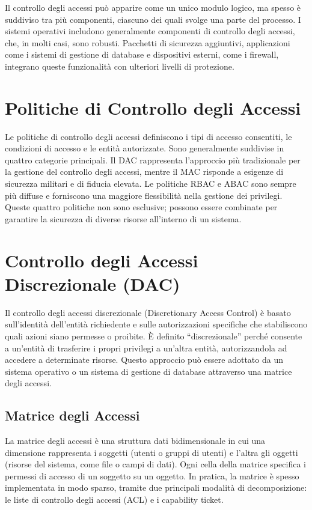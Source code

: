 Il controllo degli accessi può apparire come un unico modulo logico, ma spesso è suddiviso tra più componenti, ciascuno dei quali svolge una parte del processo. I sistemi operativi includono generalmente componenti di controllo degli accessi, che, in molti casi, sono robusti. Pacchetti di sicurezza aggiuntivi, applicazioni come i sistemi di gestione di database e dispositivi esterni, come i firewall, integrano queste funzionalità con ulteriori livelli di protezione.

\section{Politiche di Controllo degli Accessi}

Le politiche di controllo degli accessi definiscono i tipi di accesso consentiti, le condizioni di accesso e le entità autorizzate. Sono generalmente suddivise in quattro categorie principali. Il DAC rappresenta l'approccio più tradizionale per la gestione del controllo degli accessi, mentre il MAC risponde a esigenze di sicurezza militari e di fiducia elevata. Le politiche RBAC e ABAC sono sempre più diffuse e forniscono una maggiore flessibilità nella gestione dei privilegi. Queste quattro politiche non sono esclusive; possono essere combinate per garantire la sicurezza di diverse risorse all'interno di un sistema.

\section{Controllo degli Accessi Discrezionale (DAC)}

Il controllo degli accessi discrezionale (Discretionary Access Control) è basato sull'identità dell'entità richiedente e sulle autorizzazioni specifiche che stabiliscono quali azioni siano permesse o proibite. È definito ``discrezionale'' perché consente a un'entità di trasferire i propri privilegi a un'altra entità, autorizzandola ad accedere a determinate risorse. Questo approccio può essere adottato da un sistema operativo o un sistema di gestione di database attraverso una matrice degli accessi.

\subsection{Matrice degli Accessi}

La matrice degli accessi è una struttura dati bidimensionale in cui una dimensione rappresenta i soggetti (utenti o gruppi di utenti) e l'altra gli oggetti (risorse del sistema, come file o campi di dati). Ogni cella della matrice specifica i permessi di accesso di un soggetto su un oggetto. In pratica, la matrice è spesso implementata in modo sparso, tramite due principali modalità di decomposizione: le liste di controllo degli accessi (ACL) e i capability ticket.

